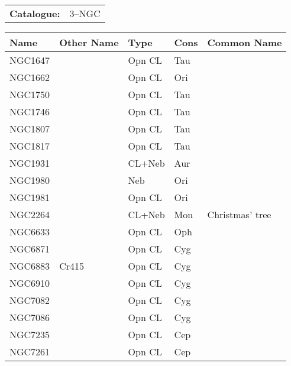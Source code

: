 \begin{tabular}{ p{0.9in} p{1.3in}}
{\bf Catalogue:} & 3--NGC \\ 
\end{tabular}
\begin{longtable}{ p{0.7in}  p{1.0in}  p{0.6in}  p{0.9in}  p{5.1in} }
\hline 
{\bf Name} & {\bf Other Name} & {\bf Type} & {\bf Cons} & {\bf Common Name} \\ 
\hline 
NGC1647 &  & Opn CL & Tau &  \\ 
NGC1662 &  & Opn CL & Ori &  \\ 
NGC1750 &  & Opn CL & Tau &  \\ 
NGC1746 &  & Opn CL & Tau &  \\ 
NGC1807 &  & Opn CL & Tau &  \\ 
NGC1817 &  & Opn CL & Tau &  \\ 
NGC1931 &  & CL+Neb & Aur &  \\ 
NGC1980 &  & Neb & Ori &  \\ 
NGC1981 &  & Opn CL & Ori &  \\ 
NGC2264 &  & CL+Neb & Mon & Christmas' tree \\ 
NGC6633 &  & Opn CL & Oph &  \\ 
NGC6871 &  & Opn CL & Cyg &  \\ 
NGC6883 & Cr415 & Opn CL & Cyg &  \\ 
NGC6910 &  & Opn CL & Cyg &  \\ 
NGC7082 &  & Opn CL & Cyg &  \\ 
NGC7086 &  & Opn CL & Cyg &  \\ 
NGC7235 &  & Opn CL & Cep &  \\ 
NGC7261 &  & Opn CL & Cep &  \\ 
\hline 
\end{longtable} 
